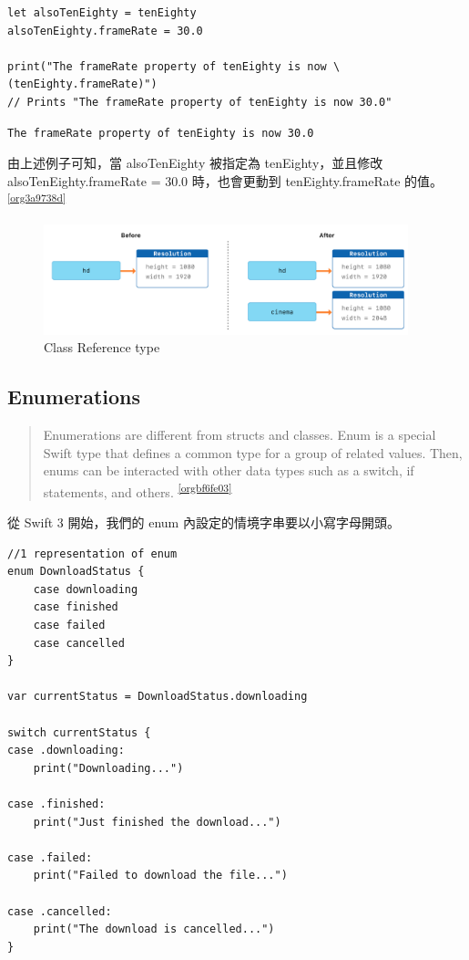 \documentclass[a4paper,12pt]{article}
\begin{document}
\begin{enumerate}
\begin{enumerate}
\begin{lstlisting}
let alsoTenEighty = tenEighty
alsoTenEighty.frameRate = 30.0

print("The frameRate property of tenEighty is now \(tenEighty.frameRate)")
// Prints "The frameRate property of tenEighty is now 30.0"
\end{lstlisting}

\begin{verbatim}
The frameRate property of tenEighty is now 30.0
\end{verbatim}


由上述例子可知，當 alsoTenEighty 被指定為 tenEighty，並且修改 alsoTenEighty.frameRate = 30.0 時，也會更動到 tenEighty.frameRate 的值。\textsuperscript{\ref{org3a9738d}}\\
\begin{figure}[htbp]
\centering
\includegraphics[width=400]{images/class.png}
\caption{\label{fig:Class-1}Class Reference type}
\end{figure}
\end{enumerate}
\end{enumerate}

\subsection{Enumerations}
\label{sec:orgaa61e8f}
\begin{verse}
Enumerations are different from structs and classes. Enum is a special Swift type that defines a common type for a group of related values. Then, enums can be interacted with other data types such as a switch, if statements, and others. \textsuperscript{\ref{orgbf6fe03}}\\
\end{verse}
從 Swift 3 開始，我們的 enum 內設定的情境字串要以小寫字母開頭。\\
\lstset{breaklines=true,language=swift,label= ,caption= ,captionpos=b,firstnumber=1,numbers=left}
\begin{lstlisting}
//1 representation of enum
enum DownloadStatus {
    case downloading
    case finished
    case failed
    case cancelled
}

var currentStatus = DownloadStatus.downloading

switch currentStatus {
case .downloading:
    print("Downloading...")

case .finished:
    print("Just finished the download...")

case .failed:
    print("Failed to download the file...")

case .cancelled:
    print("The download is cancelled...")
}
\end{lstlisting}
\end{document}
